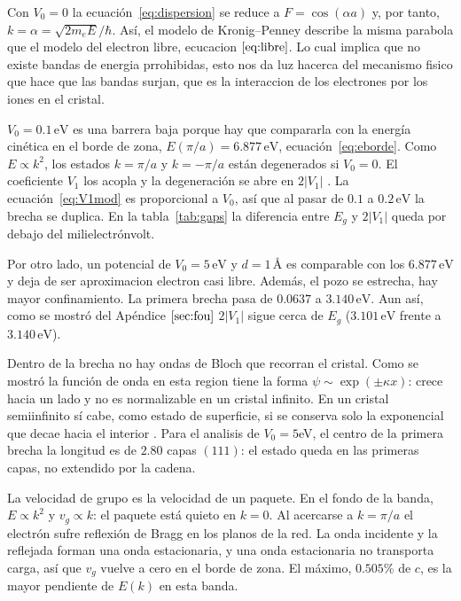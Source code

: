 \documentclass[reprint, amsmath, amssymb, aps, prb]{revtex4-2}
\begin{document}
Con $V_0=0$ la ecuación~\eqref{eq:dispersion} se reduce a $F=\cos(\alpha a)$ y, por tanto, $k=\alpha=\sqrt{2m_e E}/\hbar$. Así, el modelo de Kronig--Penney describe la misma parabola que el modelo del electron libre, ecucacion $\ref{eq:libre}$. Lo cual implica que no existe bandas de energia prrohibidas, esto nos da luz hacerca del mecanismo fisico que hace que las bandas surjan, que es la interaccion de los electrones por los iones en el cristal. 

$V_0=0.1\,\mathrm{eV}$ es una barrera baja porque hay que compararla con la energía cinética en el borde de zona, $E(\pi/a)=6.877\,\mathrm{eV}$, ecuación~\eqref{eq:eborde}. Como $E\propto k^2$, los estados $k=\pi/a$ y $k=-\pi/a$ están degenerados si $V_0=0$. El coeficiente $V_1$ los acopla y la degeneración se abre en $2|V_1|$ \cite{simon}. La ecuación~\eqref{eq:V1mod} es proporcional a $V_0$, así que al pasar de $0.1$ a $0.2\,\mathrm{eV}$ la brecha se duplica. En la tabla~\ref{tab:gaps} la diferencia entre $E_g$ y $2|V_1|$ queda por debajo del milielectrónvolt. 

Por otro lado, un potencial de $V_0=5\,\mathrm{eV}$ y $d=1\,\text{Å}$ es comparable con los $6.877\,\mathrm{eV}$ y deja de ser aproximacion electron casi libre. Además, el pozo se estrecha, hay mayor confinamiento. La primera brecha pasa de $0.0637$ a $3.140\,\mathrm{eV}$. Aun así, como se mostró del Apéndice $\ref{sec:fou}$ $2|V_1|$ sigue cerca de $E_g$ ($3.101\,\mathrm{eV}$ frente a $3.140\,\mathrm{eV}$).


Dentro de la brecha no hay ondas de Bloch que recorran el cristal. Como se mostró la función de onda en esta region tiene la forma $\psi\sim\exp(\pm\kappa x)$: crece hacia un lado y no es normalizable en un cristal infinito. En un cristal semiinfinito sí cabe, como estado de superficie, si se conserva solo la exponencial que decae hacia el interior \cite{kittel}. Para el analisis de $V_0=5$eV, el centro de la primera brecha la longitud es de $2.80$ capas $(111)$: el estado queda en las primeras capas, no extendido por la cadena.

La velocidad de grupo es la velocidad de un paquete. En el fondo de la banda, $E\propto k^2$ y $v_g\propto k$: el paquete está quieto en $k=0$. Al acercarse a $k=\pi/a$ el electrón sufre reflexión de Bragg en los planos de la red. La onda incidente y la reflejada forman una onda estacionaria, y una onda estacionaria no transporta carga, así que $v_g$ vuelve a cero en el borde de zona. El máximo, $0.505\%$ de $c$, es la mayor pendiente de $E(k)$ en esta banda. 
\end{document}
